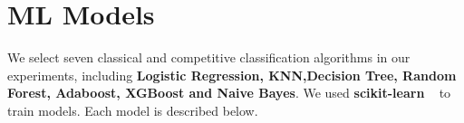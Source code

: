 \section{ML Models}

We select seven classical and competitive classification algorithms in our experiments, including \textbf{Logistic Regression, KNN,Decision Tree, Random Forest, Adaboost, XGBoost and Naive Bayes}.
We used \textbf{scikit-learn} ~\cite{Scikit-learn:2011} to train models. Each model is described
below.






